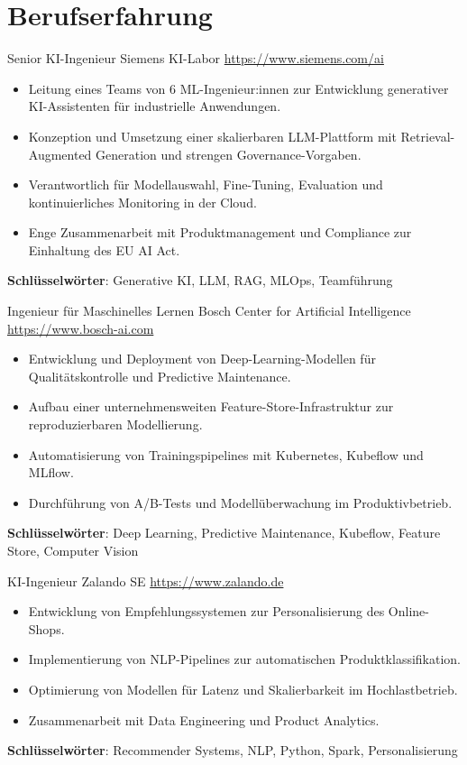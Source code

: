 \documentclass[a4paper, serif, 10pt]{moderncv}
\begin{document}
\section{Berufserfahrung}

        {Senior KI-Ingenieur}
        {Siemens KI-Labor}
        {\url{https://www.siemens.com/ai}}
        {}
        {\begin{itemize}
\item Leitung eines Teams von 6 ML-Ingenieur:innen zur Entwicklung generativer KI-Assistenten für industrielle Anwendungen.
\item Konzeption und Umsetzung einer skalierbaren LLM-Plattform mit Retrieval-Augmented Generation und strengen Governance-Vorgaben.
\item Verantwortlich für Modellauswahl, Fine-Tuning, Evaluation und kontinuierliches Monitoring in der Cloud.
\item Enge Zusammenarbeit mit Produktmanagement und Compliance zur Einhaltung des EU AI Act.
\end{itemize}
\textbf{Schlüsselwörter}: Generative KI, LLM, RAG, MLOps, Teamführung}

        {Ingenieur für Maschinelles Lernen}
        {Bosch Center for Artificial Intelligence}
        {\url{https://www.bosch-ai.com}}
        {}
        {\begin{itemize}
\item Entwicklung und Deployment von Deep-Learning-Modellen für Qualitätskontrolle und Predictive Maintenance.
\item Aufbau einer unternehmensweiten Feature-Store-Infrastruktur zur reproduzierbaren Modellierung.
\item Automatisierung von Trainingspipelines mit Kubernetes, Kubeflow und MLflow.
\item Durchführung von A/B-Tests und Modellüberwachung im Produktivbetrieb.
\end{itemize}
\textbf{Schlüsselwörter}: Deep Learning, Predictive Maintenance, Kubeflow, Feature Store, Computer Vision}

        {KI-Ingenieur}
        {Zalando SE}
        {\url{https://www.zalando.de}}
        {}
        {\begin{itemize}
\item Entwicklung von Empfehlungssystemen zur Personalisierung des Online-Shops.
\item Implementierung von NLP-Pipelines zur automatischen Produktklassifikation.
\item Optimierung von Modellen für Latenz und Skalierbarkeit im Hochlastbetrieb.
\item Zusammenarbeit mit Data Engineering und Product Analytics.
\end{itemize}
\textbf{Schlüsselwörter}: Recommender Systems, NLP, Python, Spark, Personalisierung}
\end{document}
